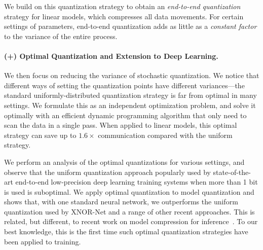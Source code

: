 \documentclass{article}
\begin{document}
We build on this quantization strategy to obtain an \emph{end-to-end quantization} strategy
for linear models, which compresses all data movements. 
For certain settings of parameters, end-to-end quantization adds as little as a \emph{constant factor} to the variance of the entire process. 

\paragraph{(+) Optimal Quantization and Extension to Deep Learning.}
We then focus on reducing the variance of  
stochastic quantization. We notice that different ways of setting the quantization points have different variances---the standard uniformly-distributed quantization strategy is far from optimal in many settings.
We formulate this as an independent optimization problem, and solve it optimally with 
an efficient dynamic programming algorithm 
that only need to scan the data in a single pass.
When applied to linear models, this optimal 
strategy can save up to $1.6\times$ communication
compared with the uniform strategy.

We perform an analysis of the optimal quantizations for various settings, and observe that the uniform quantization approach
popularly used by state-of-the-art end-to-end
low-precision deep learning training systems
when more than 1 bit is used is suboptimal.
We apply optimal quantization to 
model quantization and shows that, with one
standard neural network, we outperforms the
uniform quantization used by XNOR-Net and a
range of other recent approaches. This
is related, but different, to recent work 
on model compression for inference~\cite{Han:2016:ICLR}. 
To our best knowledge, this is the first time such optimal quantization strategies have been applied to training. 

\end{document}
